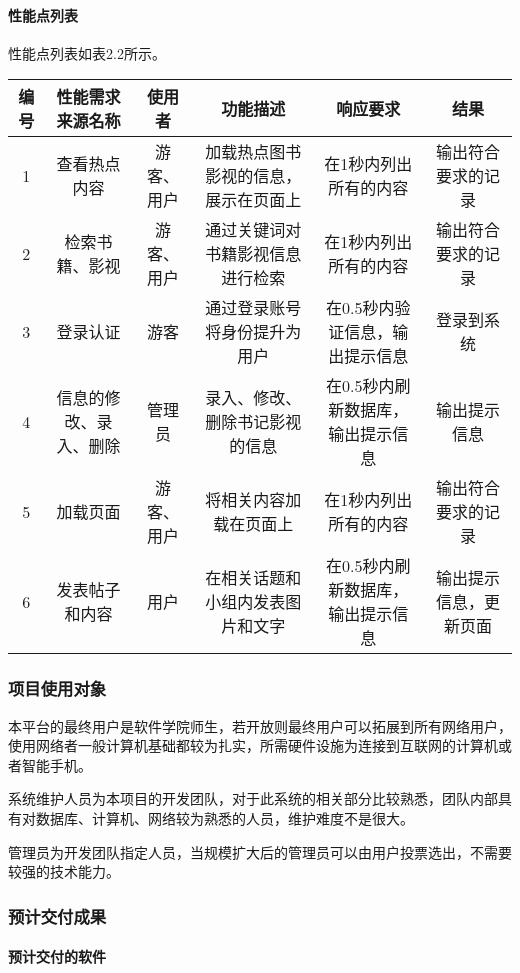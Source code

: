 \documentclass[
]{article}
\begin{document}
\hypertarget{header-n3297}{%
\paragraph{性能点列表}\label{header-n3297}}

性能点列表如表2.2所示。

\begin{longtable}[]{@{}cccccc@{}}
\toprule
编号 & 性能需求来源名称 & 使用者 & 功能描述 & 响应要求 &
结果\tabularnewline
\midrule
\endhead
1 & 查看热点内容 & 游客、用户 & 加载热点图书影视的信息，展示在页面上 &
在1秒内列出所有的内容 & 输出符合要求的记录\tabularnewline
2 & 检索书籍、影视 & 游客、用户 & 通过关键词对书籍影视信息进行检索 &
在1秒内列出所有的内容 & 输出符合要求的记录\tabularnewline
3 & 登录认证 & 游客 & 通过登录账号将身份提升为用户 &
在0.5秒内验证信息，输出提示信息 & 登录到系统\tabularnewline
4 & 信息的修改、录入、删除 & 管理员 & 录入、修改、删除书记影视的信息 &
在0.5秒内刷新数据库，输出提示信息 & 输出提示信息\tabularnewline
5 & 加载页面 & 游客、用户 & 将相关内容加载在页面上 &
在1秒内列出所有的内容 & 输出符合要求的记录\tabularnewline
6 & 发表帖子和内容 & 用户 & 在相关话题和小组内发表图片和文字 &
在0.5秒内刷新数据库，输出提示信息 &
输出提示信息，更新页面\tabularnewline
\bottomrule
\end{longtable}

\hypertarget{header-n3349}{%
\subsubsection{项目使用对象}\label{header-n3349}}

本平台的最终用户是软件学院师生，若开放则最终用户可以拓展到所有网络用户，使用网络者一般计算机基础都较为扎实，所需硬件设施为连接到互联网的计算机或者智能手机。

系统维护人员为本项目的开发团队，对于此系统的相关部分比较熟悉，团队内部具有对数据库、计算机、网络较为熟悉的人员，维护难度不是很大。

管理员为开发团队指定人员，当规模扩大后的管理员可以由用户投票选出，不需要较强的技术能力。

\hypertarget{header-n3353}{%
\subsubsection{预计交付成果}\label{header-n3353}}

\hypertarget{header-n3354}{%
\paragraph{预计交付的软件}\label{header-n3354}}
\end{document}

